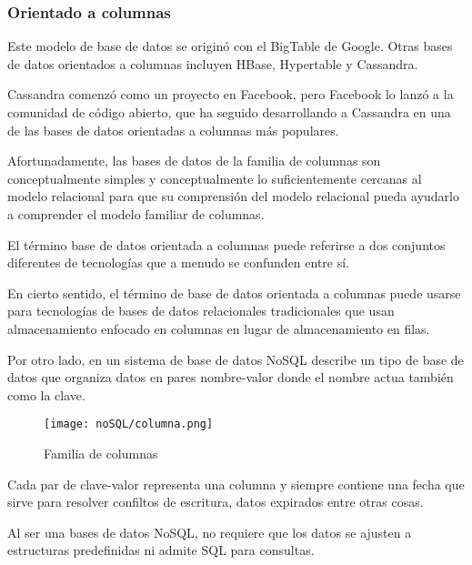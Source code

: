 \subsubsection{Orientado a columnas}
Este modelo de base de datos se originó con el BigTable de Google. Otras bases de datos orientados a columnas incluyen HBase, Hypertable y Cassandra. 


Cassandra comenzó como un proyecto en Facebook, pero Facebook lo lanzó a la comunidad de código abierto, que ha seguido desarrollando a Cassandra en una de las bases de datos orientadas a columnas más populares.




Afortunadamente, las bases de datos de la familia de columnas son conceptualmente simples y conceptualmente lo suficientemente cercanas al modelo relacional para que su comprensión del modelo relacional pueda ayudarlo a comprender el modelo familiar de columnas.


El término base de datos orientada a columnas puede referirse a dos conjuntos diferentes de tecnologías que a menudo se confunden entre sí. 


En cierto sentido, el término de base de datos orientada a columnas puede usarse para tecnologías de bases de datos relacionales tradicionales que usan almacenamiento enfocado en columnas en lugar de almacenamiento en filas. 


Por otro lado, en un sistema de base de datos NoSQL describe un tipo de base de datos que organiza datos en pares nombre-valor donde el nombre actua también como la clave.


\begin{figure}[h!t] 
    \centering
    \texttt{[image: noSQL/columna.png]}
    \caption{Familia de columnas}
    \label{img:documentos-columna}
\end{figure}


Cada par de clave-valor representa una columna y siempre contiene una fecha que sirve para resolver confiltos de escritura, datos expirados entre otras cosas.



Al ser una bases de datos NoSQL, no requiere que los datos se ajusten a estructuras predefinidas ni admite SQL para consultas.


